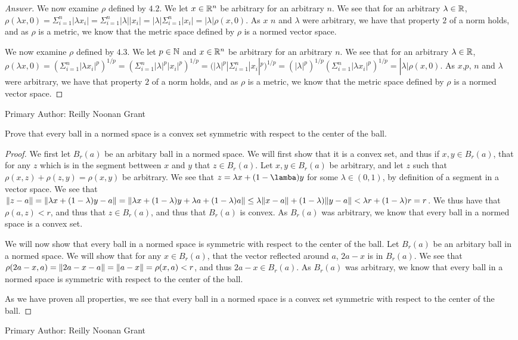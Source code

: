 \begin{proof}[Answer]
  We now examine $\rho$ defined by $4.2$. 
  We let $x\in \mathbb{R}^n$ be arbitrary for an arbitrary $n$. We see that 
  for an arbitrary $\lambda \in \mathbb{R}$, $\rho(\lambda x,0)=
  \Sigma_{i=1}^n|\lambda x_i| =
  \Sigma_{i=1}^n |\lambda| | x_i|=
  |\lambda| \Sigma_{i=1}^n | x_i|=
  |\lambda| \rho(x,0)$. As $x$  $n$ and $\lambda$ were arbitrary,
  we have that property $2$ of a norm holds, and as $\rho$ is a
  metric, we know that the metric space defined by $\rho$ is a normed
  vector space. 

  We now examine $\rho$ defined by $4.3$. 
  We let $p\in \mathbb{N}$ and $x\in \mathbb{R}^n$ be arbitrary
  for an arbitrary $n$. We see that 
  for an arbitrary $\lambda \in \mathbb{R}$, $\rho(\lambda x,0)=
  (\Sigma_{i=1}^n |\lambda x_i|^p)^{1/p} =
  (\Sigma_{i=1}^n |\lambda|^p |x_i|^p)^{1/p} =
 ( |\lambda|^p|\Sigma_{i=1}^n |x_i|^p)^{1/p} =
 ( |\lambda|^p)^{1/p}(\Sigma_{i=1}^n |\lambda x_i|^p)^{1/p} =
  |\lambda| \rho(x,0)$. As $x$,$p$, $n$ and $\lambda$ were arbitrary,
  we have that property $2$ of a norm holds, and as $\rho$ is a
  metric, we know that the metric space defined by $\rho$ is a normed
  vector space. 
\end{proof}
Primary Author: Reilly Noonan Grant

\begin{minorEx}%
    Prove that every ball in a normed space is a convex set symmetric with
    respect to the center of the ball.
\end{minorEx}

\begin{proof}
  We first let $B_r(a)$ be an arbitary ball in a normed space. We will
  first show that it is a convex set, and thus if $x,y\in B_r(a)$,
  that for any $z$ which is in the segment bettween $x$ and $y$
  that $z\in B_r(a)$. Let $x,y\in B_r(a)$ be arbitrary, and let $z$
  such that $\rho(x,z)+\rho(z,y)=\rho(x,y)$ be arbitrary. We see that
  $z= \lambda x + (1-\lamba)y$ for some $\lambda \in (0,1)$, by
  definition of a segment in a vector space. We see that 
  $\Vert z-a\Vert = \Vert\lambda x + (1-\lambda)y - a\Vert = \Vert\lambda
    x+ (1-\lambda)y + \lambda a + (1-\lambda) a\Vert \leq
  \lambda\Vert x-a\Vert + (1-\lambda)\Vert y-a\Vert< \lambda r + (1-\lambda)r
  = r$. We thus have that $\rho(a,z)< r$, and thus that $z\in B_r(a)$,
  and thus that $B_r(a)$ is convex. As $B_r(a)$ was arbitrary, we know
  that every ball in a normed space is a convex set.

  We will now show that every ball in a normed space is 
  symmetric with respect to the center of the ball.  Let $B_r(a)$ be
  an arbitary ball in a normed space. We will show that for any $x \in
  B_r(a)$, that the vector reflected around $a$, $2a -x$ is in
  $B_r(a)$. 
  We see that $\rho(2a-x,a)= \Vert2a-x -a\Vert = \Vert a-x\Vert=\rho(x,a)<r$,
  and thus $2a -x\in B_r(a)$. As $B_r(a)$ was arbitrary, we know that 
   every ball in a normed space is symmetric with respect to the
   center of the ball. 

   As we have proven all properties, we see that every ball in a
   normed space is a convex set symmetric with respect to the center
   of the ball.
\end{proof}
Primary Author: Reilly Noonan Grant

